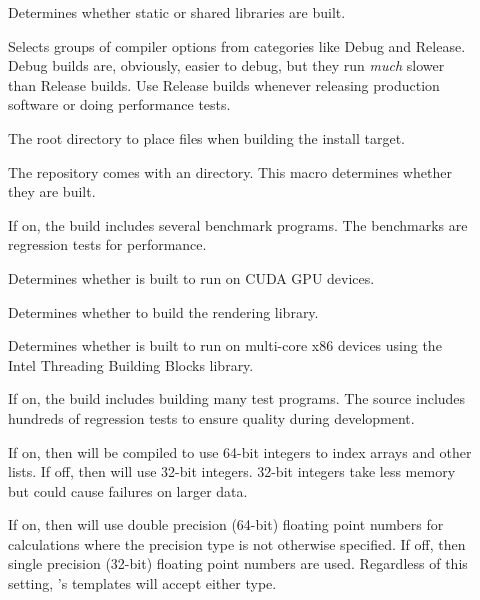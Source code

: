 \begin{description}
\item[]
  Determines whether static or shared libraries are built.
\item[]
   
  Selects groups of compiler options from categories like Debug and Release.
  Debug builds are, obviously, easier to debug, but they run \emph{much} slower than Release builds.
  Use Release builds whenever releasing production software or doing performance tests.
\item[]
  The root directory to place files when building the install target.
\item[]
  The \VTKm repository comes with an  directory.
  This macro determines whether they are built.
\item[]
  If on, the \VTKm build includes several benchmark programs.
  The benchmarks are regression tests for performance.
\item[]
  Determines whether \VTKm is built to run on CUDA GPU devices.
\item[]
  Determines whether to build the rendering library.
\item[]
  Determines whether \VTKm is built to run on multi-core x86 devices using the Intel Threading Building Blocks library.
\item[]
  If on, the \VTKm build includes building many test programs.
  The \VTKm source includes hundreds of regression tests to ensure quality during development.
\item[]
  If on, then \VTKm will be compiled to use 64-bit integers to index arrays and other lists.
  If off, then \VTKm will use 32-bit integers.
  32-bit integers take less memory but could cause failures on larger data.
\item[]
  If on, then \VTKm will use double precision (64-bit) floating point numbers for calculations where the precision type is not otherwise specified.
  If off, then single precision (32-bit) floating point numbers are used.
  Regardless of this setting, \VTKm's templates will accept either type.
\end{description}

